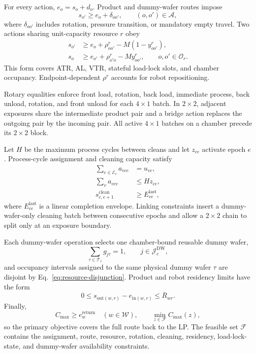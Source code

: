\documentclass[preprint,12pt,authoryear]{elsarticle}
\newcommand{\cmax}{C_{\max}}
\begin{document}
For every action, $e_o=s_o+d_o$. Product and dummy-wafer routes impose
\begin{equation}
s_{o'}\ge e_o+\delta_{oo'},\qquad(o,o')\in\mathcal A,
\label{eq:precedence}
\end{equation}
where $\delta_{oo'}$ includes rotation, pressure transition, or mandatory
empty travel. Two actions sharing unit-capacity resource $r$ obey
\begin{align}
s_{o'}&\ge e_o+\rho^r_{oo'}-M(1-y^r_{oo'}),\\
s_o&\ge e_{o'}+\rho^r_{o'o}-My^r_{oo'},
\qquad o,o'\in\mathcal O_r. \label{eq:resource-disjunction}
\end{align}
This form covers ATR, AL, VTR, stateful load-lock slots, and chamber
occupancy. Endpoint-dependent $\rho^r$ accounts for robot repositioning.

Rotary equalities enforce front load, rotation, back load, immediate process,
back unload, rotation, and front unload for each $4\times1$ batch. In
$2\times2$, adjacent exposures share the intermediate product pair and a
bridge action replaces the outgoing pair by the incoming pair. All active
$4\times1$ batches on a chamber precede its $2\times2$ block.

Let $H$ be the maximum process cycles between cleans and let $z_{ce}$ activate
epoch $e$. Process-cycle assignment and cleaning capacity satisfy
\begin{align}
\sum_{e\in\mathcal E_c}a_{vce}&=u_{vc},\\
\sum_v a_{vce}&\le Hz_{ce}, \label{eq:cleaning-capacity}\\
s^{\mathrm{clean}}_{c,e+1}&\ge E^{\mathrm{last}}_{ce},
\label{eq:cleaning-order}
\end{align}
where $E^{\mathrm{last}}_{ce}$ is a linear completion envelope. Linking
constraints insert a dummy-wafer-only cleaning batch between consecutive epochs and
allow a $2\times2$ chain to split only at an exposure boundary.

Each dummy-wafer operation selects one chamber-bound reusable dummy wafer,
\begin{equation}
\sum_{\tau\in\mathcal T_c}g_{j\tau}=1,\qquad
j\in\mathcal J_c^{\mathrm{DW}},
\label{eq:dummy-wafer-assignment}
\end{equation}
and occupancy intervals assigned to the same physical dummy wafer $\tau$ are disjoint by
Eq.~\eqref{eq:resource-disjunction}. Product and robot residency limits have
the form
\begin{equation}
0\le s_{\mathrm{out}(w,r)}-e_{\mathrm{in}(w,r)}
\le\overline R_{wr}. \label{eq:residency}
\end{equation}
Finally,
\begin{equation}
\cmax\ge e^{\mathrm{return}}_w\quad(w\in\mathcal W),\qquad
\min_{z\in\mathcal F}\cmax(z),
\label{eq:stage1}
\end{equation}
so the primary objective covers the full route back to the LP. The feasible
set $\mathcal F$ contains the assignment, route, resource, rotation, cleaning,
residency, load-lock-state, and dummy-wafer availability constraints.
\end{document}
